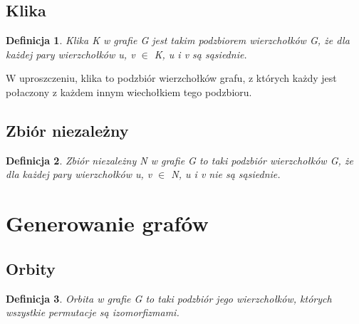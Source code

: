\documentclass[11pt]{article}
\newtheorem{definition}{Definicja}[section]
\begin{document}
   \subsection{Klika}
   \begin{definition}
    Klika K w grafie G jest takim podzbiorem wierzchołków G, że dla każdej pary wierzchołków u, v $\in$ K, u i v są sąsiednie. 
   \end{definition}
   
   W uproszczeniu, klika to podzbiór wierzchołków grafu, z których każdy jest połaczony z każdem innym wiechołkiem tego podzbioru.
   \begin{figure}[h]
   \centering
     \caption{}
  \end{figure}

  \subsection{Zbiór niezależny}
  \begin{definition}
    Zbiór niezależny N w grafie G to taki podzbiór wierzchołków G, że dla każdej pary wierzchołków u, v $\in$ N, u i v nie są sąsiednie. 
  \end{definition}
  
\section{Generowanie grafów}
\subsection{Orbity}
\begin{definition}
  Orbita w grafie G to taki podzbiór jego wierzchołków, których wszystkie permutacje są izomorfizmami. 
\end{definition}
\end{document}
